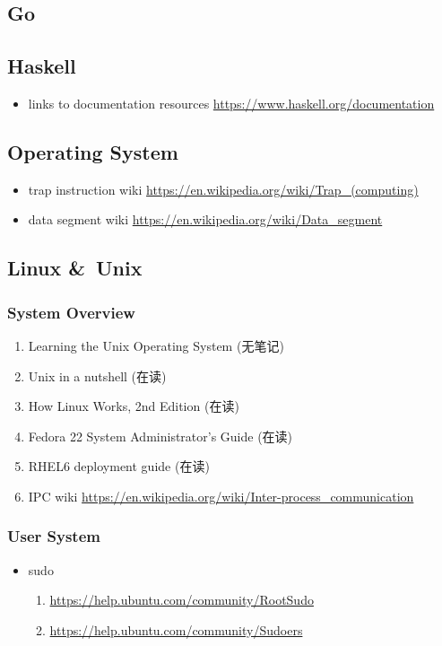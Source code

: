\documentclass{article}
\begin{document}
\subsection{Go}
%
\begin{itemize}
\end{itemize}
%
%
\subsection{Haskell}
%
\begin{itemize}
    \item links to documentation resources \url{https://www.haskell.org/documentation}
\end{itemize}
\subsection{Operating System}
%
\begin{itemize}
    \item trap instruction wiki \url{https://en.wikipedia.org/wiki/Trap_(computing)}
    \item data segment wiki \url{https://en.wikipedia.org/wiki/Data_segment}
\end{itemize}
\subsection{Linux \&\ Unix}
\subsubsection{System Overview}
\begin{enumerate}
    \item Learning the Unix Operating System (无笔记)
    \item Unix in a nutshell (在读)
    \item How Linux Works, 2nd Edition (在读)
    \item Fedora 22 System Administrator's Guide (在读)
    \item RHEL6 deployment guide (在读)
    \item IPC wiki \url{https://en.wikipedia.org/wiki/Inter-process_communication}
\end{enumerate}
%
\subsubsection{User System}
%
\begin{itemize}
    \item sudo
        \begin{enumerate}
            \item \url{https://help.ubuntu.com/community/RootSudo}
            \item \url{https://help.ubuntu.com/community/Sudoers}
        \end{enumerate}
\end{itemize}
%
\end{document}
